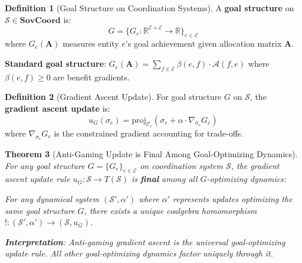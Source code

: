 \documentclass[11pt,a4paper]{article}
\newtheorem{theorem}{Theorem}[section]
\theoremstyle{definition}
\newtheorem{definition}[theorem]{Definition}
\theoremstyle{remark}
\newcommand{\E}{\mathcal{E}}
\newcommand{\A}{\mathcal{A}}
\newcommand{\C}{\mathcal{C}}
\newcommand{\SovCoord}{\mathbf{SovCoord}}
\begin{document}
\begin{definition}[Goal Structure on Coordination Systems]
A \textbf{goal structure} on $\mathcal{S} \in \SovCoord$ is:
\[ G = \{G_e: \mathbb{R}^{\E \times \E} \to \mathbb{R}\}_{e \in \E} \]
where $G_e(\mathbf{A})$ measures entity $e$'s goal achievement given allocation matrix $\mathbf{A}$.

\textbf{Standard goal structure}: $G_e(\mathbf{A}) = \sum_{f \in \E} \beta(e,f) \cdot \A(f,e)$ 
where $\beta(e,f) \ge 0$ are benefit gradients.
\end{definition}

\begin{definition}[Gradient Ascent Update]
For goal structure $G$ on $\mathcal{S}$, the \textbf{gradient ascent update} is:
\[ u_G(\sigma_e) = \text{proj}_{\C_e}\left(\sigma_e + \alpha \cdot \nabla_{\sigma_e} G_e\right) \]
where $\nabla_{\sigma_e} G_e$ is the constrained gradient accounting for trade-offs.
\end{definition}

\begin{theorem}[Anti-Gaming Update is Final Among Goal-Optimizing Dynamics]
\label{thm:terminal-coalgebra}
For any goal structure $G = \{G_e\}_{e \in \E}$ on coordination system $\mathcal{S}$, the gradient ascent update rule $u_G: \mathcal{S} \to T(\mathcal{S})$ is \textbf{final} among all $G$-optimizing dynamics:

For any dynamical system $(\mathcal{S}', \alpha')$ where $\alpha'$ represents updates optimizing the same goal structure $G$, there exists a unique coalgebra homomorphism $!: (\mathcal{S}', \alpha') \to (\mathcal{S}, u_G)$.

\textbf{Interpretation}: Anti-gaming gradient ascent is the universal goal-optimizing update rule. All other goal-optimizing dynamics factor uniquely through it.
\end{theorem}
\end{document}
